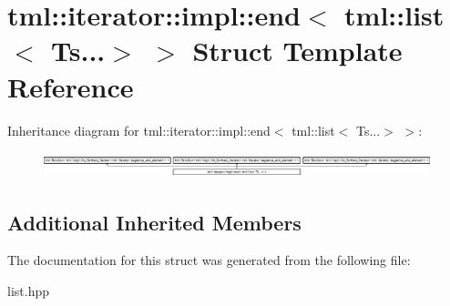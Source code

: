 \hypertarget{structtml_1_1iterator_1_1impl_1_1end_3_01tml_1_1list_3_01Ts_8_8_8_4_01_4}{\section{tml\+:\+:iterator\+:\+:impl\+:\+:end$<$ tml\+:\+:list$<$ Ts...$>$ $>$ Struct Template Reference}
\label{structtml_1_1iterator_1_1impl_1_1end_3_01tml_1_1list_3_01Ts_8_8_8_4_01_4}
}
Inheritance diagram for tml\+:\+:iterator\+:\+:impl\+:\+:end$<$ tml\+:\+:list$<$ Ts...$>$ $>$\+:\begin{figure}[H]
\begin{center}
\leavevmode
\includegraphics[height=0.754209cm]{structtml_1_1iterator_1_1impl_1_1end_3_01tml_1_1list_3_01Ts_8_8_8_4_01_4}
\end{center}
\end{figure}
\subsection*{Additional Inherited Members}


The documentation for this struct was generated from the following file\+:\begin{DoxyCompactItemize}
\item 
list.\+hpp\end{DoxyCompactItemize}
